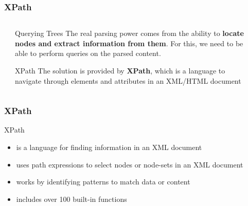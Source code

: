 \documentclass{beamer}\usepackage[]{graphicx}\usepackage[]{color}
\begin{document}
\begin{frame}
\frametitle{XPath}

\begin{columns}[t]
\begin{column}{0.1\textwidth}
\end{column}
\begin{column}{0.8\textwidth}

\begin{block}{Querying Trees}
The real parsing power comes from the ability to \textbf{locate nodes and extract information from them}. For this, we need to be able to perform queries on the parsed content.
\end{block}

\begin{block}{XPath}
The solution is provided by \textbf{XPath}, which is a language to navigate through elements and attributes in an XML/HTML document
\end{block}

\end{column}
\begin{column}{0.1\textwidth}
\end{column}
\end{columns}

\end{frame}


\begin{frame}
\frametitle{XPath}

\begin{block}{XPath}
\begin{itemize}
 \item is a language for finding information in an XML document
 \item uses path expressions to select nodes or node-sets in an XML document
 \item works by identifying patterns to match data or content
 \item includes over 100 built-in functions
\end{itemize}
\end{block}

\end{frame}

\end{document}
